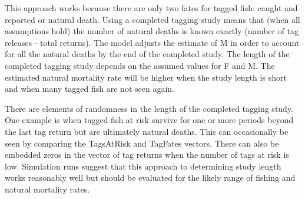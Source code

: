 \documentclass[
]{krantz}
\makeatletter
\newenvironment{Shaded}{\begin{snugshade}}{\end{snugshade}}
\newcommand{\AttributeTok}[1]{\textcolor[rgb]{0.27,0.27,0.27}{#1}}
\newcommand{\CommentTok}[1]{\textcolor[rgb]{0.37,0.37,0.37}{\textit{#1}}}
\newcommand{\DecValTok}[1]{\textcolor[rgb]{0.06,0.06,0.06}{#1}}
\newcommand{\FloatTok}[1]{\textcolor[rgb]{0.06,0.06,0.06}{#1}}
\newcommand{\FunctionTok}[1]{\textcolor[rgb]{0.27,0.27,0.27}{\textbf{#1}}}
\newcommand{\NormalTok}[1]{#1}
\newcommand{\OtherTok}[1]{\textcolor[rgb]{0.37,0.37,0.37}{#1}}
\newcommand{\SpecialCharTok}[1]{\textcolor[rgb]{0.43,0.43,0.43}{\textbf{#1}}}
\newcommand{\StringTok}[1]{\textcolor[rgb]{0.5,0.5,0.5}{#1}}
\newenvironment{kframe}{%
\medskip{}
\setlength{\fboxsep}{.8em}
 \def\at@end@of@kframe{}%
 \ifinner\ifhmode%
  \def\at@end@of@kframe{\end{minipage}}%
  \begin{minipage}{\columnwidth}%
 \fi\fi%
 \def\FrameCommand##1{\hskip\@totalleftmargin \hskip-\fboxsep
 \colorbox{shadecolor}{##1}\hskip-\fboxsep
     \hskip-\linewidth \hskip-\@totalleftmargin \hskip\columnwidth}%
 \MakeFramed {\advance\hsize-\width
   \@totalleftmargin\z@ \linewidth\hsize
   \@setminipage}}%
 {\par\unskip\endMakeFramed%
 \at@end@of@kframe}
\renewenvironment{Shaded}{\begin{kframe}}{\end{kframe}}
\makeatother
\begin{document}
\begin{Shaded}
\end{Shaded}

This approach works because there are only two fates for tagged fish: caught and reported or natural death. Using a completed tagging study means that (when all assumptions hold) the number of natural deaths is known exactly (number of tag releases - total returns). The model adjusts the estimate of M in order to account for all the natural deaths by the end of the completed study. The length of the completed tagging study depends on the assumed values for F and M. The estimated natural mortality rate will be higher when the study length is short and when many tagged fish are not seen again.

There are elements of randomness in the length of the completed tagging study. One example is when tagged fish at risk survive for one or more periods beyond the last tag return but are ultimately natural deaths. This can occasionally be seen by comparing the TagsAtRisk and TagFates vectors. There can also be embedded zeros in the vector of tag returns when the number of tags at risk is low. Simulation runs suggest that this approach to determining study length works reasonably well but should be evaluated for the likely range of fishing  and natural mortality rates.
\end{document}
